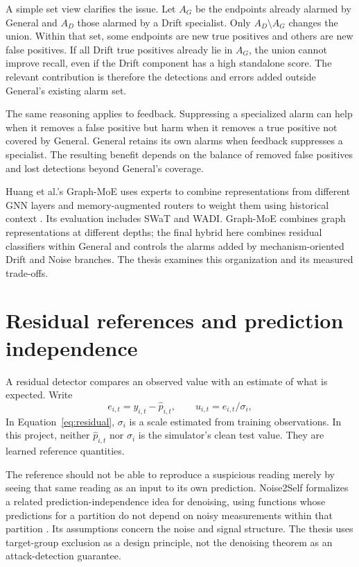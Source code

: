 A simple set view clarifies the issue. Let $A_G$ be the endpoints already alarmed by General and $A_D$ those alarmed by a Drift specialist. Only $A_D\setminus A_G$ changes the union. Within that set, some endpoints are new true positives and others are new false positives. If all Drift true positives already lie in $A_G$, the union cannot improve recall, even if the Drift component has a high standalone score. The relevant contribution is therefore the detections and errors added outside General's existing alarm set.

The same reasoning applies to feedback. Suppressing a specialized alarm can help when it removes a false positive but harm when it removes a true positive not covered by General. General retains its own alarms when feedback suppresses a specialist. The resulting benefit depends on the balance of removed false positives and lost detections beyond General's coverage.

Huang et al.'s Graph-MoE uses experts to combine representations from different GNN layers and memory-augmented routers to weight them using historical context \cite{graphmoe2025}. Its evaluation includes SWaT and WADI. Graph-MoE combines graph representations at different depths; the final hybrid here combines residual classifiers within General and controls the alarms added by mechanism-oriented Drift and Noise branches. The thesis examines this organization and its measured trade-offs.

\section{Residual references and prediction independence}
A residual detector compares an observed value with an estimate of what is expected. Write
\begin{equation}
 e_{i,t}=y_{i,t}-\widehat p_{i,t},\qquad
 u_{i,t}=e_{i,t}/\sigma_i,
 \label{eq:residual}
\end{equation}
In Equation~\eqref{eq:residual}, $\sigma_i$ is a scale estimated from training observations. In this project, neither $\widehat p_{i,t}$ nor $\sigma_i$ is the simulator's clean test value. They are learned reference quantities.

The reference should not be able to reproduce a suspicious reading merely by seeing that same reading as an input to its own prediction. Noise2Self formalizes a related prediction-independence idea for denoising, using functions whose predictions for a partition do not depend on noisy measurements within that partition \cite{noise2self}. Its assumptions concern the noise and signal structure. The thesis uses target-group exclusion as a design principle, not the denoising theorem as an attack-detection guarantee.

